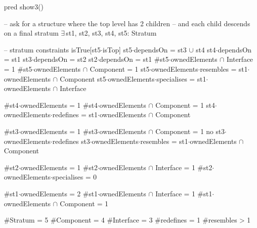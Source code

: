pred show3()
{
  -- ask for a structure where the top level has 2 children
  -- and each child descends on a final stratum
  $\exists\,$st1, st2, st3, st4, st5: Stratum
  {
    -- stratum constraints
    isTrue[st5$\cdot$isTop]
    st5$\cdot$dependsOn = st3 $\cup$ st4
    st4$\cdot$dependsOn = st1
    st3$\cdot$dependsOn = st2
    st2$\cdot$dependsOn = st1
    #st5$\cdot$ownedElements $\cap$ Interface = 1
    #st5$\cdot$ownedElements $\cap$ Component = 1
    st5$\cdot$ownedElements$\cdot$resembles = st1$\cdot$ownedElements $\cap$ Component
    st5$\cdot$ownedElements$\cdot$specialises = st1$\cdot$ownedElements $\cap$ Interface
    
    #st4$\cdot$ownedElements = 1
    #st4$\cdot$ownedElements $\cap$ Component = 1
    st4$\cdot$ownedElements$\cdot$redefines = st1$\cdot$ownedElements $\cap$ Component

    #st3$\cdot$ownedElements = 1
    #st3$\cdot$ownedElements $\cap$ Component = 1
    no st3$\cdot$ownedElements$\cdot$redefines
    st3$\cdot$ownedElements$\cdot$resembles = st1$\cdot$ownedElements $\cap$ Component

    #st2$\cdot$ownedElements = 1
    #st2$\cdot$ownedElements $\cap$ Interface = 1
    #st2$\cdot$ownedElements$\cdot$specialises = 0
    
    #st1$\cdot$ownedElements = 2
    #st1$\cdot$ownedElements $\cap$ Interface = 1
    #st1$\cdot$ownedElements $\cap$ Component = 1
  }
  
  #Stratum = 5
  #Component = 4
  #Interface = 3
  #redefines = 1
  #resembles > 1
}



